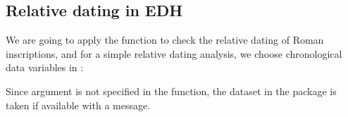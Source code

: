 \documentclass[a4paper,12pt,english]{sphinxhowto}
\begin{document}
\begin{savenotes}\sphinxattablestart
\centering
\begin{tabulary}{\linewidth}[t]{|T|T|}
\hline

&
\\
\hline
\end{tabulary}
\par
\sphinxattableend\end{savenotes}



\subsection{Relative dating in EDH}
\label{\detokenize{EDHVariables:relative-dating-in-edh}}\label{\detokenize{EDHVariables:rel-dat}}
We are going to apply the  function to check the relative dating of Roman inscriptions, and
for a simple relative dating analysis, we choose chronological data variables in :

\begin{sphinxVerbatim}[commandchars=\\\{\},formatcom=\footnotesize]
  
\end{sphinxVerbatim}

Since argument  is not specified in the function, the  dataset in the  package is taken if available
with a  message.
\end{document}
